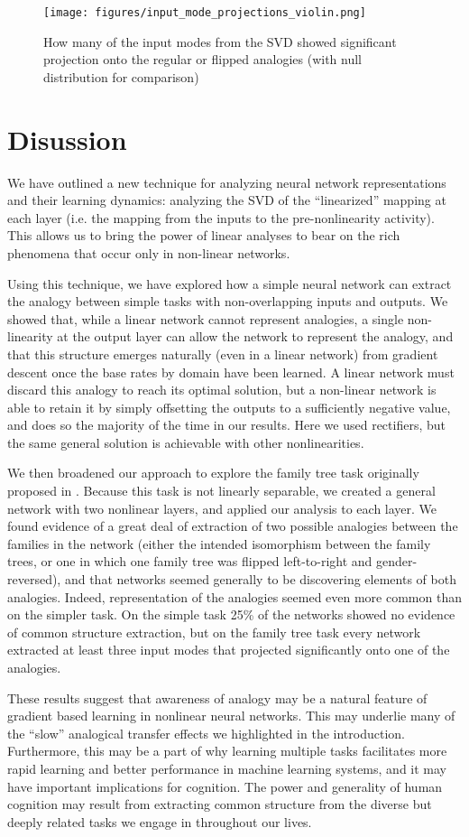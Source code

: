 \documentclass[10pt,letterpaper]{article}
\begin{document}
\begin{figure}
\centering
\texttt{[image: figures/input\_mode\_projections\_violin.png]}
\caption{How many of the input modes from the SVD showed significant projection onto the regular or flipped analogies (with null distribution for comparison)}
\label{ft_input_mode_sig_hist}
\end{figure}
\section{Disussion}
We have outlined a new technique for analyzing neural network representations and their learning dynamics: analyzing the SVD of the ``linearized'' mapping at each layer (i.e. the mapping from the inputs to the pre-nonlinearity activity). This allows us to bring the power of linear analyses to bear on the rich phenomena that occur only in non-linear networks.\par
Using this technique, we have explored how a simple neural network can extract the analogy between simple tasks with non-overlapping inputs and outputs. We showed that, while a linear network cannot represent analogies, a single non-linearity at the output layer can allow the network to represent the analogy, and that this structure emerges naturally (even in a linear network) from gradient descent once the base rates by domain have been learned. A linear network must discard this analogy to reach its optimal solution, but a non-linear network is able to retain it by simply offsetting the outputs to a sufficiently negative value, and does so the majority of the time in our results. Here we used rectifiers, but the same general solution is achievable with other nonlinearities. \par 
We then broadened our approach to explore the family tree task originally proposed in \citet{Hinton1986}. Because this task is not linearly separable, we created a general network with two nonlinear layers, and applied our analysis to each layer. We found evidence of a great deal of extraction of two possible analogies between the families in the network (either the intended isomorphism between the family trees, or one in which one family tree was flipped left-to-right and gender-reversed), and that networks seemed generally to be discovering elements of both analogies. Indeed, representation of the analogies seemed even more common than on the simpler task. On the simple task 25\% of the networks showed no evidence of common structure extraction, but on the family tree task every network extracted at least three input modes that projected significantly onto one of the analogies. \par 
These results suggest that awareness of analogy may be a natural feature of gradient based learning in nonlinear neural networks. This may underlie many of the ``slow'' analogical transfer effects we highlighted in the introduction. Furthermore, this may be a part of why learning multiple tasks facilitates more rapid learning and better performance in machine learning systems, and it may have important implications for cognition. The power and generality of human cognition may result from extracting common structure from the diverse but deeply related tasks we engage in throughout our lives. 
\end{document}
